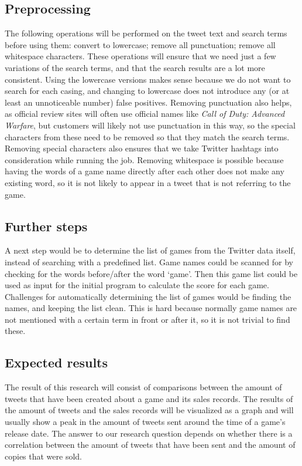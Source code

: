\subsection{Preprocessing}
The following operations will be performed on the tweet text and search terms before using them:
convert to lowercase;
remove all punctuation;
remove all whitespace characters.
These operations will ensure that we need just a few variations of the search terms, and that the search results are a lot more consistent. Using the lowercase versions makes sense because we do not want to search for each casing, and changing to lowercase does not introduce any (or at least an unnoticeable number) false positives. Removing punctuation also helps, as official review sites will often use official names like \textit{Call of Duty: Advanced Warfare}, but customers will likely not use punctuation in this way, so the special characters from these need to be removed so that they match the search terms. Removing special characters also ensures that we take Twitter hashtags into consideration while running the job. Removing whitespace is possible because having the words of a game name directly after each other does not make any existing word, so it is not likely to appear in a tweet that is not referring to the game.
\subsection{Further steps}
A next step would be to determine the list of games from the Twitter data itself, instead of searching with a predefined list. Game names could be scanned for by checking for the words before/after the word ‘game’. Then this game list could be used as input for the initial program to calculate the score for each game. Challenges for automatically determining the list of games would be finding the names, and keeping the list clean. This is hard because normally game names are not mentioned with a certain term in front or after it, so it is not trivial to find these.
\subsection{Expected results}
The result of this research will consist of comparisons between the amount of tweets that have been created about a game and its sales records. The results of the amount of tweets and the sales records will be visualized as a graph and will usually show a peak in the amount of tweets sent around the time of a game’s release date. The answer to our research question depends on whether there is a correlation between the amount of tweets that have been sent and the amount of copies that were sold.


